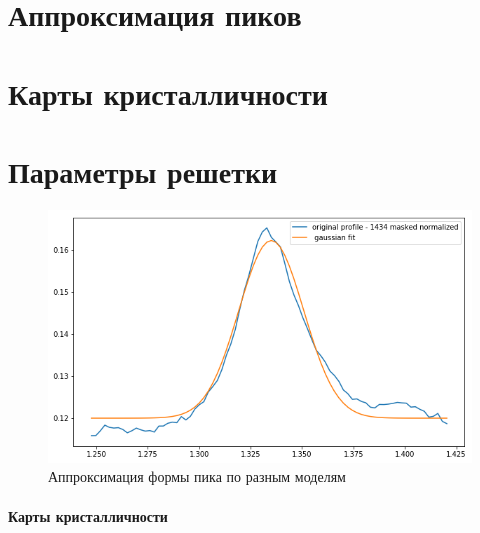 	\section{Аппроксимация пиков}

	\section{Карты кристалличности}
	
	\section{Параметры решетки}
	
	

\begin{figure}
    \centering
    \includegraphics[width=\linewidth]{fig/gauss-fit.png}
    \caption{Аппроксимация формы пика по разным моделям}
    \label{fig:my_label}
\end{figure}
	
	\paragraph{Карты кристалличности}
	
